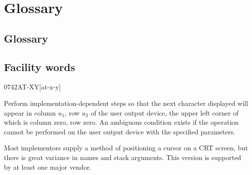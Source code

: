 \section{Glossary} %

\begin{info}
\subsection{Glossary}
\end{info}

\subsection{Facility words} %

\begin{newword}{0742}{AT-XY}[at-x-y]

	Perform implementation-dependent steps so that the next
	character displayed will appear in column $u_1$, row $u_2$ of
	the user output device, the upper left corner of which is
	column zero, row zero. An ambiguous condition exists if the
	operation cannot be performed on the user output device with
	the specified parameters.

	\begin{rationale} %
		Most implementors supply a method of positioning a cursor on
		a CRT screen, but there is great variance in names and stack
		arguments. This version is supported by at least one major
		vendor.
	\end{rationale}
\end{newword}


